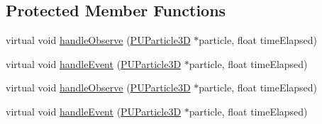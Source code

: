 \subsection*{Protected Member Functions}
\begin{DoxyCompactItemize}
\item 
virtual void \hyperlink{classPUObserver_a45f88a4df42b5812129f0cdb1acdef0b}{handle\+Observe} (\hyperlink{structPUParticle3D}{P\+U\+Particle3D} $\ast$particle, float time\+Elapsed)
\item 
virtual void \hyperlink{classPUObserver_a17d1b4aad5474b11a9aa20373e18189a}{handle\+Event} (\hyperlink{structPUParticle3D}{P\+U\+Particle3D} $\ast$particle, float time\+Elapsed)
\item 
virtual void \hyperlink{classPUObserver_ac40b9b0e19178cfc83f7c389d40bce59}{handle\+Observe} (\hyperlink{structPUParticle3D}{P\+U\+Particle3D} $\ast$particle, float time\+Elapsed)
\item 
virtual void \hyperlink{classPUObserver_add59b575d5f91e3b1768b2dd5785991a}{handle\+Event} (\hyperlink{structPUParticle3D}{P\+U\+Particle3D} $\ast$particle, float time\+Elapsed)
\end{DoxyCompactItemize}
